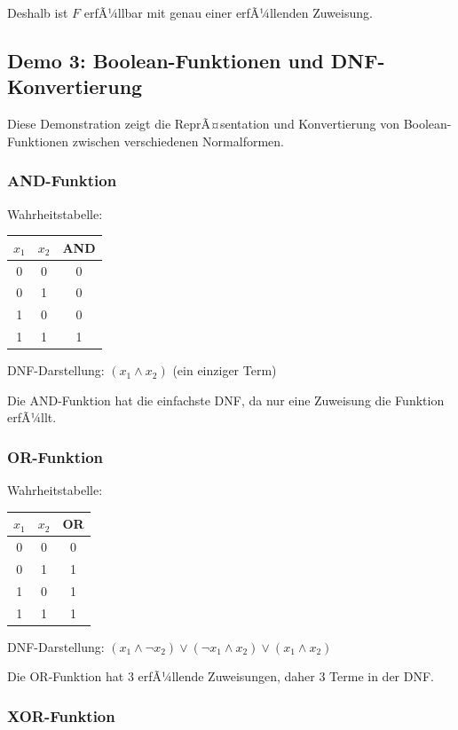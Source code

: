 ﻿\documentclass[a4paper,12pt]{article}
\theoremstyle{definition}
\begin{document}
Deshalb ist $F$ erfÃ¼llbar mit genau einer erfÃ¼llenden Zuweisung.

\subsection{Demo 3: Boolean-Funktionen und DNF-Konvertierung}

Diese Demonstration zeigt die ReprÃ¤sentation und Konvertierung von Boolean-Funktionen zwischen verschiedenen Normalformen.

\subsubsection{AND-Funktion}

Wahrheitstabelle:
\begin{center}
\begin{tabular}{cc|c}
$x_1$ & $x_2$ & AND \\
\hline
0 & 0 & 0 \\
0 & 1 & 0 \\
1 & 0 & 0 \\
1 & 1 & 1
\end{tabular}
\end{center}

DNF-Darstellung: $(x_1 \land x_2)$ (ein einziger Term)

Die AND-Funktion hat die einfachste DNF, da nur eine Zuweisung die Funktion erfÃ¼llt.

\subsubsection{OR-Funktion}

Wahrheitstabelle:
\begin{center}
\begin{tabular}{cc|c}
$x_1$ & $x_2$ & OR \\
\hline
0 & 0 & 0 \\
0 & 1 & 1 \\
1 & 0 & 1 \\
1 & 1 & 1
\end{tabular}
\end{center}

DNF-Darstellung: $(x_1 \land \neg x_2) \lor (\neg x_1 \land x_2) \lor (x_1 \land x_2)$

Die OR-Funktion hat 3 erfÃ¼llende Zuweisungen, daher 3 Terme in der DNF.

\subsubsection{XOR-Funktion}
\end{document}

